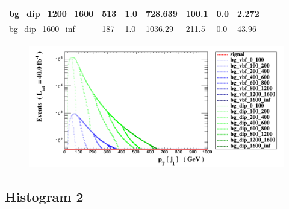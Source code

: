 \documentclass[a4paper, 10pt]{article}
\begin{document}
\begin{table}[H]
\begin{center}
\begin{tabular}{|m{23.0mm}|m{23.0mm}|m{18.0mm}|m{19.0mm}|m{19.0mm}|m{19.0mm}|m{19.0mm}|}
      \hline
      {\cellcolor{white}         bg\_dip\_1200\_1600}& {\cellcolor{white}         513}& {\cellcolor{white}         1.0}& {\cellcolor{white}         728.639}& {\cellcolor{white}         100.1}& {\cellcolor{green}         0.0}& {\cellcolor{green}         2.272}\\
      \hline
      {\cellcolor{white}         bg\_dip\_1600\_inf}& {\cellcolor{white}         187}& {\cellcolor{white}         1.0}& {\cellcolor{white}         1036.29}& {\cellcolor{white}         211.5}& {\cellcolor{red}         0.0}& {\cellcolor{red}         43.96}\\
\hline
    \end{tabular}
  \end{center}
\end{table}

\begin{figure}[H]
  \begin{center}
    \includegraphics[scale=0.45]{selection_0.png}\\
\caption{   }
  \end{center}
\end{figure}
      \newpage
\subsection{ Histogram 2}
\end{document}
